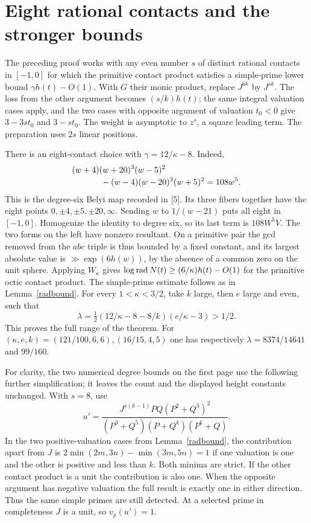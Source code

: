 \documentclass[11pt]{article}
\begin{document}
\section{Eight rational contacts and the stronger bounds}
The preceding proof works with any even number $s$ of distinct rational contacts in $[-1,0]$ for which the primitive contact product satisfies a simple-prime lower bound $\gamma h(t)-O(1)$. With $G$ their monic product, replace $J^{6k}$ by $J^{sk}$. The loss from the other argument becomes $(s/k)h(t)$; the same integral valuation cases apply, and the two cases with opposite argument of valuation $t_0<0$ give $3-3s t_0$ and $3-s t_0$. The weight is asymptotic to $z^s$, a square leading term. The preparation uses $2s$ linear positions.

There is an eight-contact choice with $\gamma=12/\kappa-8$. Indeed,
\begin{align*}
 &(w+4)(w+20)^3(w-5)^2\\[-2pt]
 &\hspace{12mm}-(w-4)(w-20)^3(w+5)^2=108w^5 .
\end{align*}
This is the degree-six Belyi map recorded in [5]. Its three fibers together have the eight points $0,\pm4,\pm5,\pm20,\infty$. Sending $w$ to $1/(w-21)$ puts all eight in $[-1,0]$. Homogenize the identity to degree six, so its last term is $108W^5V$. The two forms on the left have nonzero resultant. On a primitive pair the gcd removed from the $abc$ triple is thus bounded by a fixed constant, and its largest absolute value is $\gg\exp(6h(w))$, by the absence of a common zero on the unit sphere. Applying $W_\kappa$ gives $\log\operatorname{rad} N(t)\ge(6/\kappa)h(t)-O(1)$ for the primitive octic contact product. The simple-prime estimate follows as in Lemma~\ref{radbound}. For every $1<\kappa<3/2$, take $k$ large, then $e$ large and even, such that
\[
 \lambda=\tfrac12(12/\kappa-8-8/k)(e/\kappa-3)>1/2.
\]
This proves the full range of the theorem. For $(\kappa,e,k)=(121/100,6,6),(16/15,4,5)$ one has respectively $\lambda=8374/14641$ and $99/160$.

For clarity, the two numerical degree bounds on the first page use the following further simplification; it leaves the count and the displayed height constants unchanged. With $s=8$, use
\[
 u'=\frac{J^{s(k-1)}PQ(P^2+Q^3)^2}
 {(P^3+Q^5)(P+Q^k)(P^k+Q)}.
\]
In the two positive-valuation cases from Lemma~\ref{radbound}, the contribution apart from $J$ is
$2\min(2m,3n)-\min(3m,5n)=1$ if one valuation is one and the other is positive and less than $k$. Both minima are strict. If the other contact product is a unit the contribution is also one. When the opposite argument has negative valuation the full result is exactly one in either direction. Thus the same simple primes are still detected. At a selected prime in completeness $J$ is a unit, so $v_p(u')=1$.
\end{document}
